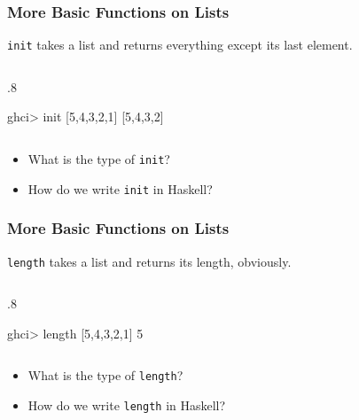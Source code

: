 \documentclass{beamer}
\newenvironment{codeblock}[1][.8]{%
\begin{columns}
\begin{column}{#1\linewidth}
\begin{exampleblock}{}}{%
\end{exampleblock}
\end{column}
\end{columns}}
\begin{document}
\begin{frame}[fragile]
\frametitle{More Basic Functions on Lists}


\verb+init+ takes a list and returns everything except its last element.

\begin{codeblock}
\begin{hcode}
ghci> init [5,4,3,2,1]  
[5,4,3,2]   
\end{hcode}
\end{codeblock}

\begin{itemize}

\item What is the type of \verb+init+?

\item How do we write \verb+init+ in Haskell?

\end{itemize}

\end{frame}


\begin{frame}[fragile]
\frametitle{More Basic Functions on Lists}


\verb+length+ takes a list and returns its length, obviously.

\begin{codeblock}
\begin{hcode}
ghci> length [5,4,3,2,1]  
5
\end{hcode}
\end{codeblock}

\begin{itemize}

\item What is the type of \verb+length+?

\item How do we write \verb+length+ in Haskell?

\end{itemize}

\end{frame}

\end{document}
